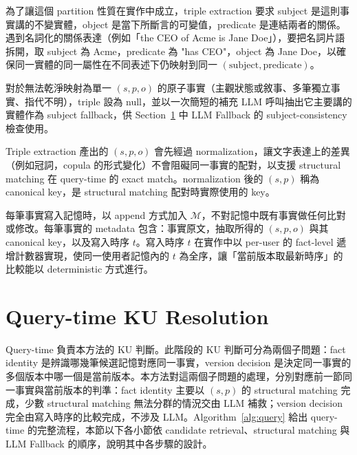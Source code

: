 為了讓這個 partition 性質在實作中成立，triple extraction 要求 subject 是這則事實講的不變實體，object 是當下所斷言的可變值，predicate 是連結兩者的關係。遇到名詞化的關係表達（例如「the CEO of Acme is Jane Doe」），要把名詞片語拆開，取 subject 為 Acme，predicate 為 "has CEO"，object 為 Jane Doe，以確保同一實體的同一屬性在不同表述下仍映射到同一 $(\text{subject}, \text{predicate})$。
 
對於無法乾淨映射為單一 $(s, p, o)$ 的原子事實（主觀狀態或敘事、多筆獨立事實、指代不明），triple 設為 null，並以一次簡短的補充 LLM 呼叫抽出它主要講的實體作為 subject fallback，供 Section~\ref{sec:querytime} 中 LLM Fallback 的 subject-consistency 檢查使用。
 
Triple extraction 產出的 $(s, p, o)$ 會先經過 normalization，讓文字表達上的差異（例如冠詞，copula 的形式變化）不會阻礙同一事實的配對，以支援 structural matching 在 query-time 的 exact match。normalization 後的 $(s, p)$ 稱為 canonical key，是 structural matching 配對時實際使用的 key。
 
每筆事實寫入記憶時，以 append 方式加入 $\mathcal{M}$，不對記憶中既有事實做任何比對或修改。每筆事實的 metadata 包含：事實原文，抽取所得的 $(s, p, o)$ 與其 canonical key，以及寫入時序 $t$。寫入時序 $t$ 在實作中以 per-user 的 fact-level 遞增計數器實現，使同一使用者記憶內的 $t$ 為全序，讓「當前版本取最新時序」的比較能以 deterministic 方式進行。
 
\section{Query-time KU Resolution}
\label{sec:querytime}
Query-time 負責本方法的 KU 判斷。此階段的 KU 判斷可分為兩個子問題：fact identity 是辨識哪幾筆候選記憶對應同一事實，version decision 是決定同一事實的多個版本中哪一個是當前版本。本方法對這兩個子問題的處理，分別對應前一節同一事實與當前版本的判準：fact identity 主要以 $(s, p)$ 的 structural matching 完成，少數 structural matching 無法分群的情況交由 LLM 補救；version decision 完全由寫入時序的比較完成，不涉及 LLM。Algorithm~\ref{alg:query} 給出 query-time 的完整流程，本節以下各小節依 candidate retrieval、structural matching 與 LLM Fallback 的順序，說明其中各步驟的設計。

